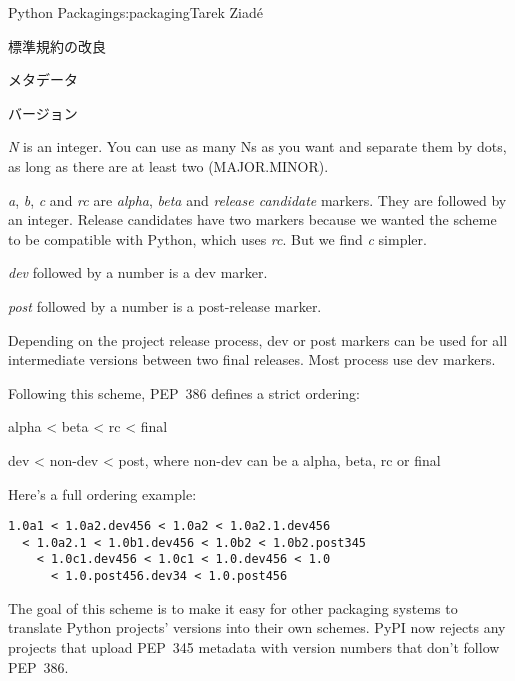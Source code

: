 \begin{aosachapter}{Python Packaging}{s:packaging}{Tarek Ziad\'{e}}
\begin{aosasect1}{標準規約の改良}
\begin{aosasect2}{メタデータ}
\begin{aosasect3}{バージョン}
\begin{aosaitemize}
  \item \emph{N} is an integer. You can use as many Ns as you want and
  separate them by dots, as long as there are at least two
  (MAJOR.MINOR).

  \item \emph{a}, \emph{b}, \emph{c} and \emph{rc} are \emph{alpha},
  \emph{beta} and \emph{release candidate} markers. They are followed
  by an integer. Release candidates have two markers because we wanted
  the scheme to be compatible with Python, which uses \emph{rc}. But
  we find \emph{c} simpler.

  \item \emph{dev} followed by a number is a dev marker.

  \item \emph{post} followed by a number is a post-release marker.

\end{aosaitemize}

\noindent
Depending on the project release process, dev or post markers can be used for
all intermediate versions between two final releases. Most process use
dev markers.

\pagebreak

Following this scheme, PEP~386 defines a strict ordering:

\begin{aosaitemize}

  \item alpha {\textless} beta {\textless} rc {\textless} final

  \item dev {\textless} non-dev {\textless} post, where non-dev can be a alpha, beta,
  rc or final

\end{aosaitemize}

\noindent
Here's a full ordering example:

\begin{verbatim}
1.0a1 < 1.0a2.dev456 < 1.0a2 < 1.0a2.1.dev456
  < 1.0a2.1 < 1.0b1.dev456 < 1.0b2 < 1.0b2.post345
    < 1.0c1.dev456 < 1.0c1 < 1.0.dev456 < 1.0
      < 1.0.post456.dev34 < 1.0.post456
\end{verbatim}

\noindent
The goal of this scheme is to make it easy for other packaging systems
to translate Python projects' versions into their own schemes.  PyPI
now rejects any projects that upload PEP~345 metadata with version numbers
that don't follow PEP~386.


\end{aosasect3}
\end{aosasect2}
\end{aosasect1}
\end{aosachapter}
